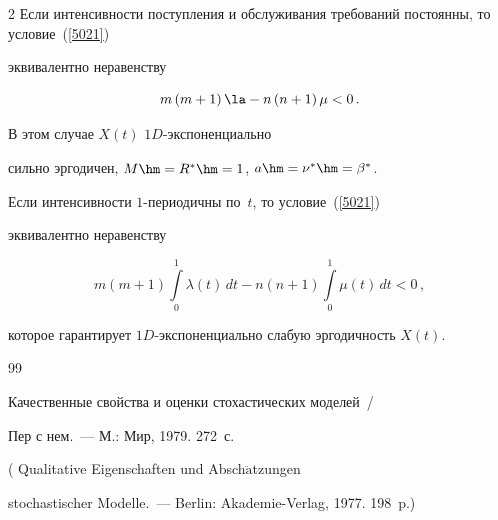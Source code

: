 \begin{multicols}{2}
Если интенсивности поступления и обслуживания требований постоянны, то условие~(\ref{5021})

эквивалентно неравенству

\begin{equation*}

 m\left(m+1\right)\la - n\left(n+1\right)\mu < 0\,.


\end{equation*}

В этом случае $X(t)$  $1D$-экс\-по\-нен\-ци\-аль\-но

сильно эргодичен, $M\hm=R^* \hm=1$, $a\hm = \nu^*\hm= \beta^*$.



\smallskip



Если интенсивности  $1$-пе\-ри\-о\-дич\-ны по~$t$, то условие~(\ref{5021})

эквивалентно неравенству

\begin{equation*}

m\left(m+1\right)\int\limits_0^1\lambda(t) \, dt  - n\left(n+1\right)

\int\limits_0^1\mu(t) \, dt < 0\,,


\end{equation*}

которое гарантирует $1D$-экс\-по\-нен\-ци\-аль\-но слабую эргодичность $X(t)$.



{\small\frenchspacing

{%


\begin{thebibliography}{99}








 Качественные свойства и оценки стохастических моделей~/

Пер с нем.~--- М.: Мир, 1979. 272~с.

( Qualitative Eigenschaften und Absch$\ddot{\mbox{a}}$tzungen

stochastischer Modelle.~--- Berlin: Akademie-Verlag, 1977. 198~p.)






\end{thebibliography}}}
\end{multicols}
